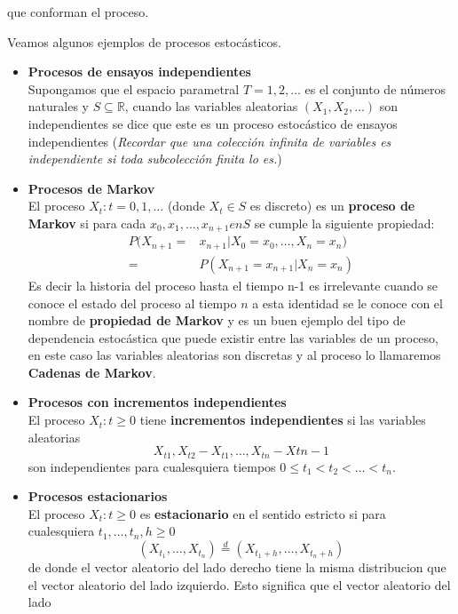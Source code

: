 \documentclass[10pt,a4paper]{article}
\theoremstyle{definition}
\theoremstyle{remark}
\newcommand{\ds}{\displaystyle}
\begin{document}
\begin{multicols}{2}
\begin{itemize}
	que conforman el proceso.
\end{itemize}
Veamos algunos ejemplos de procesos estocásticos.
\begin{itemize}
	\item \textbf{Procesos de ensayos independientes}\\
	Supongamos que el espacio parametral $T={1,2,\dots}$ es el conjunto de números 
	naturales y $\ds{S \subseteq \mathbb{R}}$, cuando las variables aleatorias $\ds{       (X_{1},X_{2},\dots)}$ son independientes se dice que este es un proceso estocástico de
	ensayos independientes (\textit{Recordar que una colección infinita de variables es independiente si toda subcolección finita lo es.})\\
	\item \textbf{Procesos de Markov} \\
	El proceso ${X_{t}: t=0,1,\dots}$ (donde $X_{t} \in S$ es discreto) es un 
	\textbf{proceso de Markov} si para cada $x_0,x_1,\dots,x_{n+1} en S$ se cumple la 
	siguiente propiedad:
	\begin{align*}
	P(X_{n+1}=& x_{n+1}|X_0=x_0,\dots,X_n=x_n)\\
	=& P(X_{n+1}=x_{n+1}|X_{n}=x_n)
	\end{align*}
	Es decir la historia del proceso hasta el tiempo n-1 es irrelevante cuando se conoce 
	el estado del proceso al tiempo $n$ a esta identidad se le conoce con el nombre de 
	\textbf{propiedad de Markov} y es un buen ejemplo del tipo de 
	dependencia estocástica que puede existir entre las variables de un proceso, en este 
	caso las variables aleatorias son discretas y al proceso lo llamaremos 
	\textbf{Cadenas de Markov}.\\
	\item \textbf{Procesos con incrementos independientes} \\
	El proceso $ {X_{t}: t \geq 0}$ tiene \textbf{incrementos independientes} si las 
	variables aleatorias $$X_{t1},X_{t2}-X_{t1},\dots, X_{tn}- X{tn-1}$$ son 
	independientes para cualesquiera tiempos  $0\leq t_{1}<t_{2}<\dots<t_{n}.$\\
	\item \textbf{Procesos estacionarios}\\
	El proceso ${X_{t}:t\geq0}$ es \textbf{estacionario} en el sentido estricto si para 
	cualesquiera $t_1,\dots,t_n,h \geq 0$
	$$(X_{t_1},\dots,X_{t_n})\stackrel{d}{=}(X_{t_1+h},\dots,X_{t_n+h})$$
	de donde el vector aleatorio del lado derecho tiene la misma distribucion que el 
	vector aleatorio del lado izquierdo. Esto significa que el vector aleatorio del lado 

\end{itemize}
\end{multicols}
\end{document}
